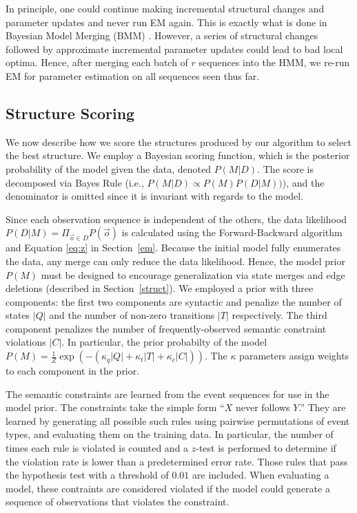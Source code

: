 \documentclass[letterpaper]{article}
\begin{document}
In principle, one could continue making incremental structural changes and
parameter updates and never run EM again. This is exactly
what is done in
Bayesian Model Merging (BMM) \cite{stolcke1994best}.
However, a series of structural changes followed
by approximate incremental parameter updates could lead to bad
local optima. Hence, after merging each batch of $r$ sequences into the HMM,  we
re-run EM for parameter estimation on all sequences seen thus far.









\subsection{Structure Scoring}
\label{sec:fb}

We now describe how we score the structures produced by our algorithm to select the best structure.
We employ a Bayesian scoring function, which is
the posterior probability of the model given the data, denoted $P(M|D)$.  The score is decomposed via Bayes Rule (i.e., $P(M|D) \propto P(M) P(D|M))$), and the denominator is omitted since it is invariant with regards to the model.

Since each observation sequence is independent of the others,
the data likelihood $P(D|M) = \Pi_{\vec{o} \in D} P(\vec{o})$ is calculated
using the Forward-Backward algorithm and Equation \ref{eq:z} in
Section~\ref{em}. Because the initial model fully enumerates the data, any merge can only reduce the data likelihood. Hence, the model prior $P(M)$ must be designed to encourage generalization via state merges and edge deletions (described in Section~\ref{struct}). We employed a prior with three components: the first two components are syntactic and penalize the number of states $|Q|$ and the number of non-zero transitions $|T|$ respectively. The third component penalizes the number of frequently-observed semantic constraint violations $|C|$. In particular, the prior probabilty of the model  $P(M) = \frac{1}{Z}\exp( -(\kappa_q |Q| + \kappa_t |T| +\kappa_c |C|))$.
The $\kappa$ parameters assign weights to each component in the prior.


The semantic constraints are learned from the event sequences for use in the model prior.  The constraints take the simple form ``$X$ never follows $Y$.''  They are learned by generating all possible such rules using
pairwise permutations of event types, and evaluating them on the training data.
In particular, the number of times each rule is violated is counted and a $z$-test is performed to determine if the violation rate is lower than a predetermined error rate. Those rules that pass the hypothesis test with a threshold of $0.01$ are included.  When evaluating a model, these contraints are considered violated if the model could generate a sequence of observations that violates the constraint. %
\end{document}

